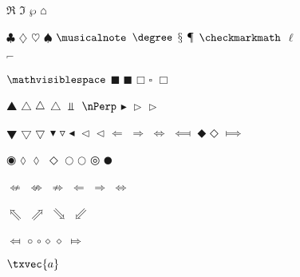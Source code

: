 \documentclass[captions=tableheading]{scrartcl}
\begin{document}
$\Re$
$\Im$
$\wp$
$\house$

$\clubsuit$
$\diamondsuit$
$\heartsuit$
$\spadesuit$
$\musicalnote$
$\degree$
$\mathsection$
$\mathparagraph$
$\checkmarkmath$
$\ell$


$\invnot$


$\mathvisiblespace$
$\mdlgblksquare$ $\blacksquare$
$\mdlgwhtsquare$ $\square$ $\Box$

$\bigblacktriangleup$
$\bigtriangleup$ $\varbigtriangleup$ $\triangle$
$\Perp$
$\nPerp$
$\blacktriangleright$
$\vartriangleright$
$\rhd$

$\bigblacktriangledown$
$\bigtriangledown$ $\varbigtriangledown$
$\blacktriangledown$
$\triangledown$
$\blacktriangleleft$
$\vartriangleleft$
$\lhd$
$\Longleftarrow$
$\Longrightarrow$
$\Longleftrightarrow$
$\Longmapsfrom$
$\mdlgblkdiamond$
$\mdlgwhtdiamond$
$\Longmapsto$

$\fisheye$
$\mdlgwhtlozenge$ $\lozenge$ $\Diamond$
$\mdlgwhtcircle$ $\bigcirc$
$\bullseye$
$\mdlgblkcircle$

$\nLeftarrow$
$\nLeftrightarrow$
$\nRightarrow$
$\Leftarrow$
$\Rightarrow$
$\Leftrightarrow$

$\Nwarrow$
$\Nearrow$
$\Searrow$
$\Swarrow$

$\Mapsfrom$
$\smwhtcircle$ $\circ$
$\smwhtdiamond$ $\diamond$
$\Mapsto$

$\txvec{a}$
\end{document}
